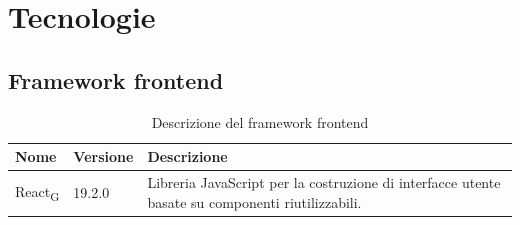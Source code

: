 \documentclass[11pt,a4paper]{article}
\newcommand{\gls}[1]{#1\textsubscript{G}}
\begin{document}
\newpage


\section{Tecnologie}

\subsection{Framework frontend}
\begin{table}[H]
    \centering
    \begin{tabular}{|p{}|p{}|p{}|}
        \hline
        \textbf{Nome} & \textbf{Versione} & \textbf{Descrizione} \\
        \hline
        \gls{React} & 19.2.0 & Libreria JavaScript per la costruzione di interfacce utente basate su componenti riutilizzabili. \\
        \hline
    \end{tabular}
    \caption{Descrizione del framework frontend}
    \label{tab:framework_frontend}
\end{table}
\end{document}
